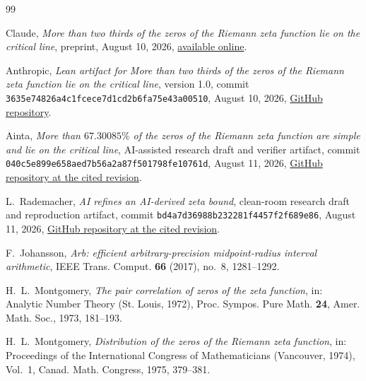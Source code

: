 \documentclass[11pt]{article}
\begin{document}
\clearpage
\begin{thebibliography}{99}
\small

Claude,
\emph{More than two thirds of the zeros of the Riemann zeta function lie on the critical line},
preprint, August 10, 2026,
\href{https://www-cdn.anthropic.com/564f962e60643842f5fcb4a17c9dbc8f608f1c37.pdf}
{available online}.

Anthropic,
\emph{Lean artifact for More than two thirds of the zeros of the Riemann zeta
function lie on the critical line}, version 1.0, commit
\texttt{3635e748\allowbreak26a4c1fc\allowbreak ece7d1cd\allowbreak2b6fa75e\allowbreak43a00510},
August 10, 2026,
\href{https://github.com/anthropics/zeta-23-lean/tree/3635e74826a4c1fcece7d1cd2b6fa75e43a00510}
{GitHub repository}.

Ainta,
\emph{More than $67.30085\%$ of the zeros of the Riemann zeta function are
simple and lie on the critical line},
AI-assisted research draft and verifier artifact, commit
\texttt{040c5e89\allowbreak9e658aed\allowbreak7b56a2a8\allowbreak7f501798\allowbreak fe10761d},
August 11, 2026,
\href{https://github.com/ainta/zeta-simple-zeros/tree/040c5e899e658aed7b56a2a87f501798fe10761d}
{GitHub repository at the cited revision}.

L.~Rademacher,
\emph{AI refines an AI-derived zeta bound},
clean-room research draft and reproduction artifact, commit
\texttt{bd4a7d36\allowbreak988b2322\allowbreak81f4457f\allowbreak2f689e86},
August 11, 2026,
\href{https://github.com/learademacher/ai-refines-ai-zeta-bound/tree/bd4a7d36988b23220034527881f4457f2f689e86}
{GitHub repository at the cited revision}.

F.~Johansson,
\emph{Arb: efficient arbitrary-precision midpoint-radius interval arithmetic},
IEEE Trans. Comput. \textbf{66} (2017), no.~8, 1281--1292.

H.~L.~Montgomery,
\emph{The pair correlation of zeros of the zeta function},
in: Analytic Number Theory (St. Louis, 1972),
Proc. Sympos. Pure Math. \textbf{24}, Amer. Math. Soc., 1973, 181--193.

H.~L.~Montgomery,
\emph{Distribution of the zeros of the Riemann zeta function},
in: Proceedings of the International Congress of Mathematicians
(Vancouver, 1974), Vol.~1,
Canad. Math. Congress, 1975, 379--381.

\end{thebibliography}
\end{document}
